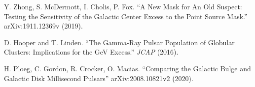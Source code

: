 \documentclass{C://Aliases//Dropbox-MIT//Latex_Templates//personal}
\begin{document}
\begin{thebibliography}{99}
     Y. Zhong, S. McDermott, I. Cholis, P. Fox. ``A New Mask for An Old Suspect: Testing the Sensitivity of the Galactic Center Excess to the Point Source Mask.'' arXiv:1911.12369v (2019).

     D. Hooper and T. Linden. ``The Gamma-Ray Pulsar Population of
    Globular Clusters: Implications for the GeV Excess.'' \textit{JCAP} (2016).

     H. Ploeg, C. Gordon, R. Crocker, O. Macias. ``Comparing the Galactic Bulge and Galactic Disk Millisecond Pulsars'' arXiv:2008.10821v2 (2020).

\end{thebibliography}
\end{document}
